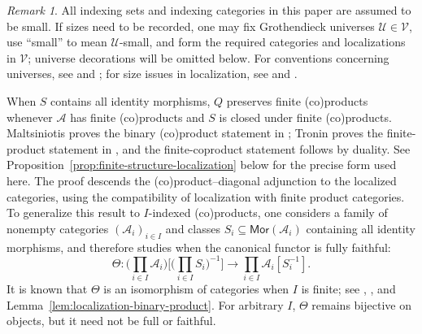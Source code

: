 \documentclass[10pt,a4paper]{amsart}
\theoremstyle{plain}
\theoremstyle{definition}
\theoremstyle{remark}
\newtheorem{remark}[theorem]{Remark}
\begin{document}
\begin{remark}
  All indexing sets and indexing categories in this paper are assumed to be small.
  If sizes need to be recorded, one may fix Grothendieck universes $\mathcal U\in\mathcal V$, use ``small'' to mean $\mathcal U$-small, and form the required categories and localizations in $\mathcal V$; universe decorations will be omitted below.
  For conventions concerning universes, see \cite[Expos\'e~I, \S~0 and Appendix, \S\S~1--5]{SGA4} and \cite[pp.~320--321, ``Conventions ensemblistes'']{CisinskiDerivable}; for size issues in localization, see \cite[Chapter~I, \S~1.3; Chapter~II, \S\S~2.1--2.2]{VerdierDerived} and \cite[pp.~425--426]{NandaUniverseFractions}.
\end{remark}

When $S$ contains all identity morphisms, $Q$ preserves finite (co)products whenever $\mathcal A$ has finite (co)products and $S$ is closed under finite (co)products.
Maltsiniotis proves the binary (co)product statement in \cite[Proposition~2.1.8, p.~75]{MaltsiniotisGrothendieck}; Tronin proves the finite-product statement in \cite[Theorem~1.3, p.~1526]{TroninProducts}, and the finite-coproduct statement follows by duality.
See Proposition~\ref{prop:finite-structure-localization} below for the precise form used here.
The proof descends the (co)product--diagonal adjunction to the localized categories, using the compatibility of localization with finite product categories.
To generalize this result to $I$-indexed (co)products,
one considers a family of nonempty categories $(\mathcal A_i)_{i\in I}$ and classes $S_i\subseteq\mathsf{Mor}(\mathcal A_i)$ containing all identity morphisms,
and therefore studies when the canonical functor is fully faithful:
\[
  \Theta:
  \bigg(\prod_{i\in I}\mathcal A_i\bigg)
  \bigg[\bigg(\prod_{i\in I}S_i\bigg)^{-1}\bigg]
  \longrightarrow
  \prod_{i\in I}\mathcal A_i[S_i^{-1}].
\]
It is known that $\Theta$ is an isomorphism of categories when $I$ is finite; see \cite[Lemma~2.1.7, pp.~74--75]{MaltsiniotisGrothendieck}, \cite[Theorem~1.2, pp.~1524--1525]{TroninProducts}, and Lemma~\ref{lem:localization-binary-product}.
For arbitrary $I$, $\Theta$ remains bijective on objects, but it need not be full or faithful.

\medskip
\end{document}
